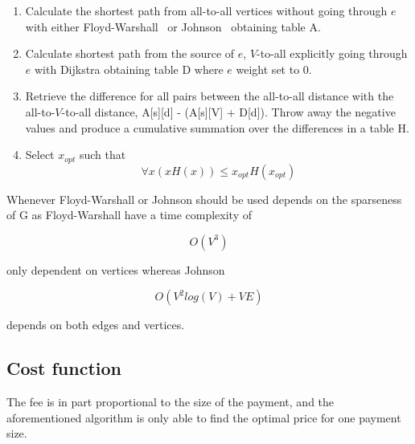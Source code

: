 \begin{enumerate}
	\item Calculate the shortest path from all-to-all vertices without going through $e$ with either Floyd-Warshall~\cite{bakhtiar:floyd:warshall} or Johnson~\cite{johnson:shortest:path:sparse:network} obtaining table A.
	\item Calculate shortest path from the source of $e$, $V$-to-all explicitly going through $e$ with Dijkstra obtaining table D where $e$ weight set to 0.
	\item Retrieve the difference for all pairs between the all-to-all distance with the all-to-$V$-to-all distance, A[s][d] - (A[s][V] + D[d]). Throw away the negative values and produce a cumulative summation over the differences in a table H.
	\item Select $x_{opt}$ such that \[ \forall x (x H(x)) \leq x_{opt} H(x_{opt}) \]
	
	


\end{enumerate} 

Whenever Floyd-Warshall or Johnson should be used depends on the sparseness of G as Floyd-Warshall have a time complexity of

\[ O(V^3) \]

only dependent on vertices whereas Johnson

\[ O(V^2 log(V) + VE ) \]

depends on both edges and vertices. 

\subsection{Cost function}

The fee is in part proportional to the size of the payment, and the aforementioned algorithm is only able to find the optimal price for one payment size.  


